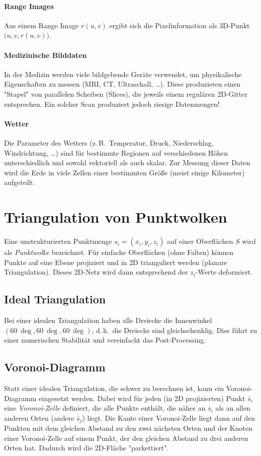 \documentclass[a4paper, 11pt, accentcolor = tud3b]{tudreport}
\renewcommand{\dh}{d.\,h.~}
\newcommand{\zB}{z.\,B.~}
\begin{document}
			\paragraph{Range Images}
				Aus einem Range Image \( r(u, v) \) ergibt sich die Pixelinformation als 3D-Punkt \( \big(u, v, r(u, v)\big) \).

			\paragraph{Medizinische Bilddaten}
				In der Medizin werden viele bildgebende Geräte verwendet, um physikalische Eigenschaften zu messen (MRI, CT, Ultraschall, \dots). Diese produzieren einen "Stapel" von parallelen Scheiben (Slices), die jeweils einem regulären 2D-Gitter entsprechen. Ein solcher Scan produziert jedoch riesige Datenmengen!

			\paragraph{Wetter}
				Die Parameter des Wetters (\zB Temperatur, Druck, Niederschlag, Windrichtung, \dots) sind für bestimmte Regionen auf verschiedenen Höhen unterschiedlich und sowohl vektoriell als auch skalar. Zur Messung dieser Daten wird die Erde in viele Zellen einer bestimmten Größe (meist einige Kilometer) aufgeteilt.

		\section{Triangulation von Punktwolken}
			Eine unstrukturierten Punktmenge \( s_i = (x_i, y_i, z_i) \) auf einer Oberflächen \(S\) wird als \emph{Punktwolke} bezeichnet. Für einfache Oberflächen (ohne Falten) können Punkte auf eine Ebene projiziert und in 2D trianguliert werden (planare Triangulation). Dieses 2D-Netz wird dann entsprechend der \(z_i\)-Werte deformiert.

			\subsection{Ideal Triangulation}
				Bei einer idealen Triangulation haben alle Dreiecke die Innenwinkel \( (\SI{60}{\deg}, \SI{60}{\deg}, \SI{60}{\deg}) \), \dh die Dreiecke sind gleichschenklig. Dies führt zu einer numerischen Stabilität und vereinfacht das Post-Processing.

			\subsection{Voronoi-Diagramm}
				Statt einer idealen Triangulation, die schwer zu berechnen ist, kann ein Voronoi-Diagramm eingesetzt werden. Dabei wird für jeden (in 2D projizierten) Punkt \( \bar{s}_i \) eine \emph{Voronoi-Zelle} definiert, die alle Punkte enthält, die näher an \( \bar{s}_i \) als an allen anderen Orten (andere \( \bar{s}_j \)) liegt. Die Kante einer Voronoi-Zelle liegt dann auf den Punkten mit dem gleichen Abstand zu den zwei nächsten Orten und der Knoten einer Voronoi-Zelle auf einem Punkt, der den gleichen Abstand zu drei anderen Orten hat. Dadurch wird die 2D-Fläche "parkettiert".
			
\end{document}
